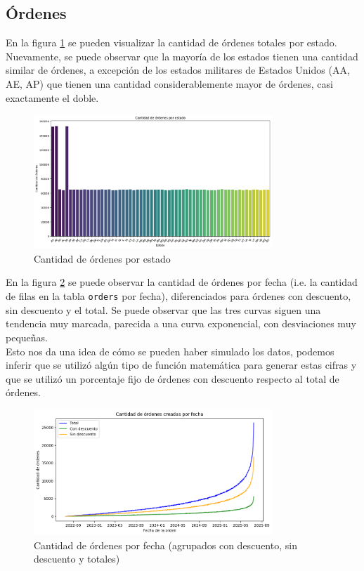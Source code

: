 \subsection{Órdenes}

En la figura \ref{fig:ordenes_por_estado} se pueden visualizar la cantidad de órdenes totales por estado. Nuevamente, se puede observar que la mayoría de los estados tienen una cantidad similar de órdenes, a excepción de los estados militares de Estados Unidos (AA, AE, AP) que tienen una cantidad considerablemente mayor de órdenes, casi exactamente el doble.

\begin{figure}[H]
    \centering
    \includegraphics[width=0.8\textwidth]{imagenes/datos_uniformes/ordenes_por_estado.png}
    \caption{Cantidad de órdenes por estado}
    \label{fig:ordenes_por_estado}
\end{figure}

En la figura \ref{fig:cantidad_de_ordenes_por_fecha} se puede observar la cantidad de órdenes por fecha (i.e. la cantidad de filas en la tabla \texttt{orders} por fecha), diferenciados para órdenes con descuento, sin descuento y el total. Se puede observar que las tres curvas siguen una tendencia muy marcada, parecida a una curva exponencial, con desviaciones muy pequeñas. \\
Esto nos da una idea de cómo se pueden haber simulado los datos, podemos inferir que se utilizó algún tipo de función matemática para generar estas cifras y que se utilizó un porcentaje fijo de órdenes con descuento respecto al total de órdenes.

\begin{figure}[H]
    \centering
    \includegraphics[width=0.8\textwidth]{imagenes/datos_uniformes/cantidad_de_ordenes_por_fecha.png}
    \caption{Cantidad de órdenes por fecha (agrupados con descuento, sin descuento y totales)}
    \label{fig:cantidad_de_ordenes_por_fecha}
\end{figure}

